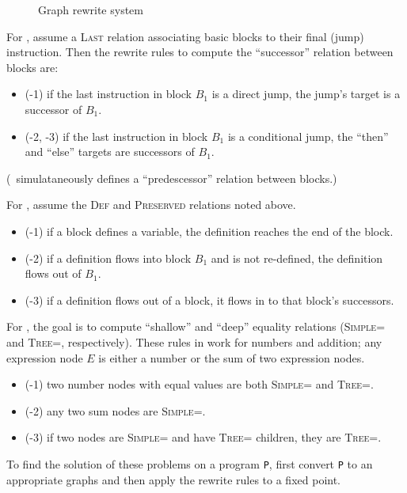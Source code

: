 \documentclass{article}
\begin{document}
\begin{figure}[t]
  
\caption{Graph rewrite system {\eq}}
\label{fig:ears-eq}
\end{figure}

For {\bb}, assume a \textsc{Last} relation associating basic blocks to their final (jump) instruction.
Then the rewrite rules to compute the ``successor'' relation between blocks are:
\begin{itemize}
\item ({\bb}-1) if the last instruction in block $B_1$ is a direct jump, the jump's target is a successor of $B_1$.
\item ({\bb}-2, {\bb}-3) if the last instruction in block $B_1$ is a conditional jump, the ``then'' and ``else'' targets are successors of $B_1$.
\end{itemize}
(\assmann\ simulataneously defines a ``predescessor'' relation between blocks.)

For {\rd}, assume the \textsc{Def} and \textsc{Preserved} relations noted above.
\begin{itemize}
\item ({\rd}-1) if a block defines a variable, the definition reaches the end of the block.
\item ({\rd}-2) if a definition flows into block $B_1$ and is not re-defined, the definition flows out of $B_1$.
\item ({\rd}-3) if a definition flows out of a block, it flows in to that block's successors.
\end{itemize}

For {\eq}, the goal is to compute ``shallow'' and ``deep'' equality relations (\textsc{Simple=} and \textsc{Tree=}, respectively).
These rules in  work for numbers and addition; any expression node $E$ is either a number or the sum of two expression nodes.
\begin{itemize}
\item ({\eq}-1) two number nodes with equal values are both \textsc{Simple=} and \textsc{Tree=}.
\item ({\eq}-2) any two sum nodes are \textsc{Simple=}.
\item ({\eq}-3) if two nodes are \textsc{Simple=} and have \textsc{Tree=} children, they are \textsc{Tree=}.
\end{itemize}

To find the solution of these problems on a program {\tt P}, first convert {\tt P} to an appropriate graphs and then apply the rewrite rules to a fixed point.
\end{document}
